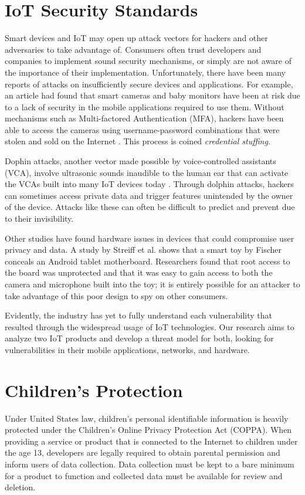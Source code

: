 \documentclass[12pt]{ucthesis}
\begin{document}
\section{IoT Security Standards}
Smart devices and IoT may open up attack vectors for hackers and other adversaries to take advantage of. Consumers often trust developers and companies to implement sound security mechanisms, or simply are not aware of the importance of their implementation. Unfortunately, there have been many reports of attacks on insufficiently secure devices and applications. For example, an article had found that smart cameras and baby monitors have been at risk due to a lack of security in the mobile applications required to use them. Without mechanisms such as Multi-factored Authentication (MFA), hackers have been able to access the cameras using username-password combinations that were stolen and sold on the Internet \cite{wp:camera}. This process is coined \textit{credential stuffing}.

Dophin attacks, another vector made possible by voice-controlled assistants (VCA), involve ultrasonic sounds inaudible to the human ear that can activate the VCAs built into many IoT devices today \cite{dolphin}. Through dolphin attacks, hackers can sometimes access private data and trigger features unintended by the owner of the device. Attacks like these can often be difficult to predict and prevent due to their invisibility.

Other studies have found hardware issues in devices that could compromise user privacy and data. A study by Streiff et al. \cite{streiff:overpowered} shows that a smart toy by Fischer conceals an Android tablet motherboard. Researchers found that root access to the board was unprotected and that it was easy to gain access to both the camera and microphone built into the toy; it is entirely possible for an attacker to take advantage of this poor design to spy on other consumers.

Evidently, the industry has yet to fully understand each vulnerability that resulted through the widespread usage of IoT technologies. Our research aims to analyze two IoT products and develop a threat model for both, looking for vulnerabilities in their mobile applications, networks, and hardware.


\section{Children's Protection}
Under United States law, children's personal identifiable information is heavily protected under the Children's Online Privacy Protection Act (COPPA). When providing a service or product that is connected to the Internet to children under the age 13, developers are legally required to obtain parental permission and inform users of data collection. Data collection must be kept to a bare minimum for a product to function and collected data must be available for review and deletion.
\end{document}
